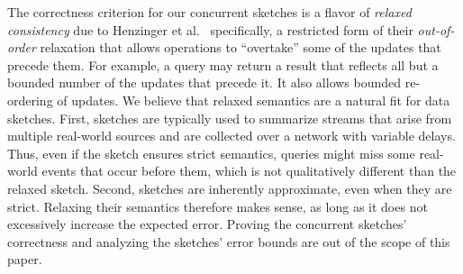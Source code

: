  The correctness criterion for our concurrent sketches is a flavor of 
 \emph{relaxed consistency} due to Henzinger et al.~\cite{Henzinger2013}    
 specifically, a restricted form of their   \emph{out-of-order} relaxation 
 that allows operations to ``overtake'' some of the updates that precede them.  
 For example, a query may return a result that reflects all but a bounded number of the updates
 that precede it. It also allows bounded re-ordering of updates.
We believe that relaxed semantics are a natural fit for data sketches. 
First, sketches are typically used to summarize streams that  arise from multiple real-world sources  
and are collected over a network with variable delays. Thus, even if the sketch ensures strict semantics, 
queries might miss some real-world events that occur before them, which is not qualitatively different than the  relaxed sketch. Second, sketches are inherently approximate, even when they are strict. 
Relaxing their semantics therefore makes sense, as long as it does not excessively increase the expected error. 
Proving the concurrent sketches' correctness and analyzing the sketches' error bounds
are out of the scope of this paper.

